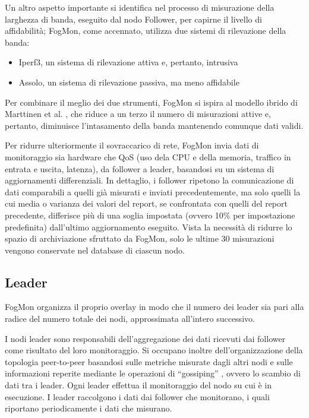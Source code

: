        
        Un altro aspetto importante si identifica nel processo di misurazione della larghezza di banda, eseguito dal nodo Follower, per capirne il livello di affidabilità; FogMon, come accennato, utilizza due sistemi di rilevazione della banda:
        \begin{itemize}
            \item Iperf3, un sistema di rilevazione attiva e, pertanto, intrusiva \cite{iperf}
            
            \item Assolo, un sistema di rilevazione passiva, ma meno affidabile \cite{assolo}
        \end{itemize}
        Per combinare il meglio dei due strumenti, FogMon si ispira al modello ibrido di Marttinen et al. \cite{marttinen}, che riduce a un terzo il numero di misurazioni attive e, pertanto, diminuisce l'intasamento della banda mantenendo comunque dati validi.
        
        Per ridurre ulteriormente il sovraccarico di rete, FogMon invia dati di monitoraggio sia hardware che QoS (uso dela CPU e della memoria, traffico in entrata e uscita, latenza), da follower a leader, basandosi su un sistema di aggiornamenti differenziali. In dettaglio, i follower ripetono la comunicazione di dati comparabili a quelli già misurati e inviati precedentemente, ma solo quelli la cui media o varianza dei valori del report, se confrontata con quelli del report precedente, differisce più di una soglia impostata (ovvero 10\% per impostazione predefinita) dall'ultimo aggiornamento eseguito. Vista la necessità di ridurre lo spazio di archiviazione sfruttato da FogMon, solo le ultime 30 misurazioni vengono conservate nel database di ciascun nodo.\\
        \subsection{Leader}
        FogMon organizza il proprio overlay in modo che il numero dei leader sia pari alla radice del numero totale dei nodi, approssimata all'intero successivo.
        
        
        I nodi leader sono responsabili dell’aggregazione dei dati ricevuti dai follower come risultato del loro monitoraggio. Si occupano inoltre dell’organizzazione della topologia peer-to-peer basandosi sulle metriche misurate dagli altri nodi e sulle informazioni reperite mediante le operazioni di “gossiping” \cite{jelasity}, ovvero lo scambio di dati tra i leader. Ogni leader effettua il monitoraggio del nodo su cui è in esecuzione. I leader raccolgono i dati dai follower che monitorano, i quali riportano periodicamente i dati che misurano.
        
